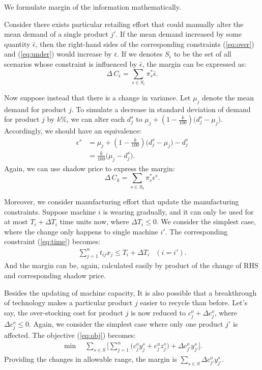 \documentclass[a4paper,11pt]{article}
\begin{document}
We formulate margin of the information mathematically.

Consider there exists particular retailing effort that could manually alter the mean demand of a single product $j'$. If the mean demand increased by some quantity $\bar{\epsilon}$, then the right-hand sides of the corresponding constraints (\ref{eq:over}) and (\ref{eq:under}) would increase by $\bar{\epsilon}$. If we denotes $S_{\bar{\epsilon}}$ to be the set of all scenarios whose constraint is influenced by $\bar{\epsilon}$, the margin can be expressed as:
\[
    \Delta \, C_{\bar{\epsilon}} = \sum_{s \in S_{\bar{\epsilon}}} \pi_s^* \bar{\epsilon}.
\]

Now suppose instead that there is a change in  variance. Let $\mu_j$ denote the mean demand for product $j$. To simulate a decrease in standard deviation of demand for product $j$ by $k\%$, we can alter each $d_j^s$ to $\mu_j + (1-\frac{k}{100}) \big( d_j^s - \mu_j \big)$. Accordingly, we should have an equivalence:
\[
\begin{aligned}
    \epsilon^s 
    & = \mu_j + (1-\frac{k}{100}) \big( d_j^s - \mu_j \big) - d_j^s\\
    & = \frac{k}{100} \big( \mu_j - d_j^s \big).
\end{aligned}
\]
Again, we can use shadow price to express the margin:
\[
    \Delta \, C_{k} = \sum_{s \in S_k} \pi_s^* \epsilon^s.
\]


Moreover, we consider manufacturing effort that update the manufacturing constraints. Suppose machine $i$ is wearing gradually, and it can only be used for at most $T_i + \Delta T_i$ time units now, where $\Delta T_i \leq 0$. We consider the simplest case, where the change only happens to single machine $i'$. The corresponding constraint (\ref{eq:time}) becomes:
\begin{eqnarray*}
    \sum_{j=1}^n t_{ij} x_j \le T_i + \Delta T_i	& (i = i').
\end{eqnarray*}
And the margin can be, again, calculated easily by product of the change of RHS and corresponding shadow price.

Besides the updating of machine capacity, It is also possible that a breakthrough of technology makes a particular product $j$ easier to recycle than before. Let's say, the over-stocking cost for product $j$ is now reduced to $c_j^o + \Delta c_j^o$, where $\Delta c_j^o \leq 0$. Again, we consider the simplest case where only one product $j'$ is affected. The objective (\ref{eq:obj}) becomes:
\begin{eqnarray*}
    \min \quad \sum_{s \in S} \big[ \sum_{j = 1}^n \big( c^o_j y_j^s + c^u_j z_j^s \big) + \Delta c_{j'}^o y_{j'}^s \big].
\end{eqnarray*}
Providing the changes in allowable range, the margin is $\sum_{s \in S} \Delta c_{j'}^o y_{j'}^s$.
\end{document}
